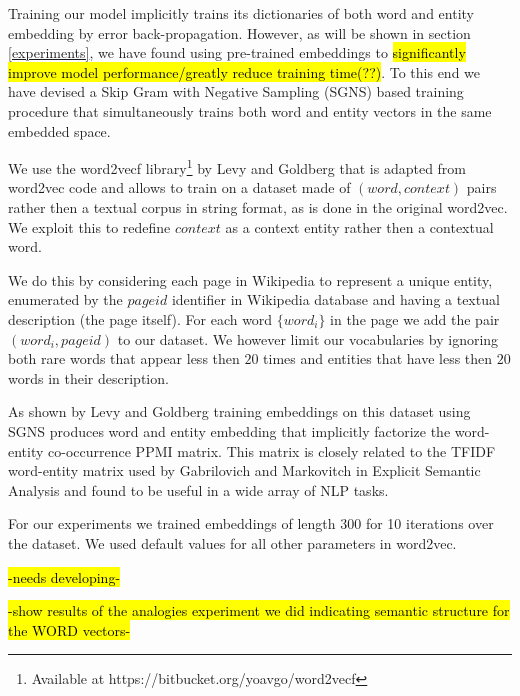 \documentclass[11pt]{article}
\begin{document}
	Training our model implicitly trains its dictionaries of both word and entity embedding by error back-propagation. However, as will be shown in section \ref{experiments}, we have found using pre-trained embeddings to \hl{significantly improve model performance/greatly reduce training time(??)}. To this end we have devised a Skip Gram with Negative Sampling (SGNS) \cite{mikolov2013distributed} based training procedure that simultaneously trains both word and entity vectors in the same embedded space.
	
	We use the word2vecf library\footnote{Available at https://bitbucket.org/yoavgo/word2vecf} by Levy and Goldberg  that is adapted from word2vec code and allows to train on a dataset made of $(word,context)$ pairs rather then a textual corpus in string format, as is done in the original word2vec. We exploit this to redefine $context$ as a context entity rather then a contextual word. 
	
	We do this by considering each page in Wikipedia to represent a unique entity, enumerated by the $pageid$ identifier in Wikipedia database and having a textual description (the page itself). For each word $\{word_i\}$ in the page we add the pair $(word_i,pageid)$ to our dataset. We however limit our vocabularies by ignoring both rare words that appear less then $20$ times and entities that have less then $20$ words in their description.
		
	As shown by Levy and Goldberg  training embeddings on this dataset using SGNS produces word and entity embedding that implicitly factorize the word-entity co-occurrence PPMI matrix. This matrix is closely related to the TFIDF word-entity matrix used by Gabrilovich and Markovitch  in Explicit Semantic Analysis and found to be useful in a wide array of NLP tasks. 
	
	For our experiments we trained embeddings of length 300 for 10 iterations over the dataset. We used default values for all other parameters in word2vec.
	
	\hl{-needs developing-}
	
	\hl{-show results of the analogies experiment we did indicating semantic structure for the WORD vectors-}
	
\end{document}
